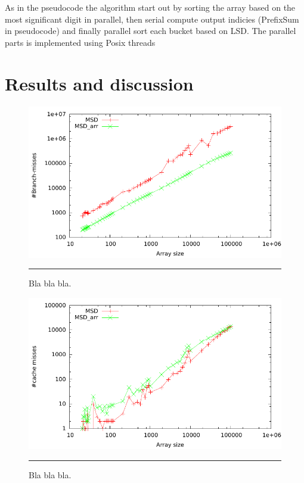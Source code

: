 As in the pseudocode the algorithm start out by sorting the array based on the most significant digit in parallel, then serial compute output indicies (PrefixSum in pseudocode) and finally parallel sort each bucket based on LSD.  
The parallel parts is implemented using Posix threads



\section{Results and discussion}


\begin{figure}[htbp]
	\centering
		\includegraphics[width=\textwidth]{./Figures/Project2b/Branch_misses.pdf}
		\rule{35em}{0.5pt}
	\caption[Branch misses]{
	Bla bla bla.
	}
	\label{fig:Branch_misses}
\end{figure}


\begin{figure}[htbp]
	\centering
		\includegraphics[width=\textwidth]{./Figures/Project2b/Cache_misses.pdf}
		\rule{35em}{0.5pt}
	\caption[Cache misses]{
	Bla bla bla.
	}
	\label{fig:Cache_misses}
\end{figure}



